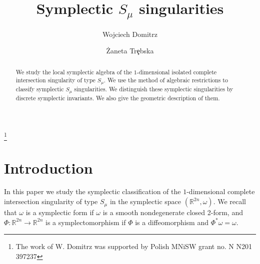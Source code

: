 \documentclass{amsart}
\theoremstyle{definition}
\numberwithin{equation}{section}
\begin{document}
\title[Symplectic $S_{\mu}$ singularities] {Symplectic $S_{\mu}$ singularities}
\author{Wojciech Domitrz}
\address{Warsaw University of Technology\\
Faculty of Mathematics and Information Science\\
Plac Politechniki 1\\
00-661 Warsaw\\
Poland\\}


\author{\.{Z}aneta Tr\c{e}bska}
\address{Warsaw University of Technology\\
Faculty of Mathematics and Information Science\\
Plac Politechniki 1\\
00-661 Warsaw\\
Poland\\}


\thanks{The work of W. Domitrz was supported by Polish MNiSW grant no. N N201 397237
}



\maketitle

\begin{abstract}
We study the local symplectic algebra of the $1$-dimensional
isolated complete intersection singularity of type $S_{\mu}$. We
use the method of algebraic restrictions to classify symplectic
$S_{\mu}$ singularities. We distinguish these symplectic
singularities by discrete symplectic invariants. We also give the
geometric description of them.
\end{abstract}

\section{Introduction}

In this paper we study the symplectic classification of the
$1$-dimensional complete intersection singularity of type
$S_{\mu}$ in the symplectic space $(\mathbb R^{2n},\omega)$. We
recall that $\omega$ is a symplectic form if $\omega$ is a smooth
nondegenerate closed 2-form, and $\Phi:\mathbb{R}^{2n}
\rightarrow\mathbb{R}^{2n}$ is a symplectomorphism if $\Phi$ is a
diffeomorphism and $\Phi ^* \omega=\omega$.
\end{document}
